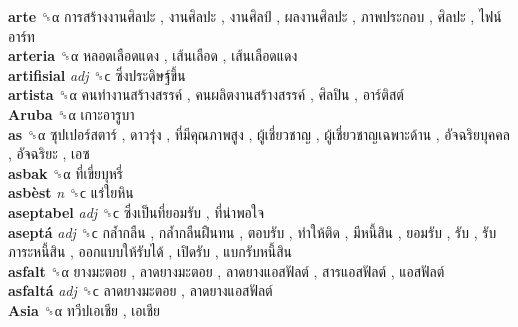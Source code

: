 \textbf{arte} ␝α   การสร้างงานศิลปะ ,  งานศิลปะ ,  งานศิลป์ ,  ผลงานศิลปะ ,  ภาพประกอบ ,  ศิลปะ ,  ไฟน์อาร์ท   \\
\textbf{arteria} ␝α   หลอดเลือดแดง ,  เส้นเลือด ,  เส้นเลือดแดง   \\
\textbf{artifisial} \emph{adj}  ␝ϲ   ซึ่งประดิษฐ์ขึ้น   \\
\textbf{artista} ␝α   คนทำงานสร้างสรรค์ ,  คนผลิตงานสร้างสรรค์ ,  ศิลปิน ,  อาร์ติสต์   \\
\textbf{Aruba} ␝α   เกาะอารูบา   \\
\textbf{as} ␝α   ซุปเปอร์สตาร์ ,  ดาวรุ่ง ,  ที่มีคุณภาพสูง ,  ผู้เชี่ยวชาญ ,  ผู้เชี่ยวชาญเฉพาะด้าน ,  อัจฉริยบุคคล ,  อัจฉริยะ ,  เอซ   \\
\textbf{asbak} ␝α   ที่เขี่ยบุหรี่   \\
\textbf{asbèst} \emph{n}  ␝ϲ   แร่ใยหิน   \\
\textbf{aseptabel} \emph{adj}  ␝ϲ   ซึ่งเป็นที่ยอมรับ ,  ที่น่าพอใจ   \\
\textbf{aseptá} \emph{adj}  ␝ϲ   กล้ำกลืน ,  กล้ำกลืนฝืนทน ,  ตอบรับ ,  ทำให้ติด ,  มีหนี้สิน ,  ยอมรับ ,  รับ ,  รับภาระหนี้สิน ,  ออกแบบให้รับได้ ,  เปิดรับ ,  แบกรับหนี้สิน   \\
\textbf{asfalt} ␝α   ยางมะตอย ,  ลาดยางมะตอย ,  ลาดยางแอสฟัลต์ ,  สารแอสฟัลต์ ,  แอสฟัลต์   \\
\textbf{asfaltá} \emph{adj}  ␝ϲ   ลาดยางมะตอย ,  ลาดยางแอสฟัลต์   \\
\textbf{Asia} ␝α   ทวีปเอเชีย ,  เอเชีย   \\
